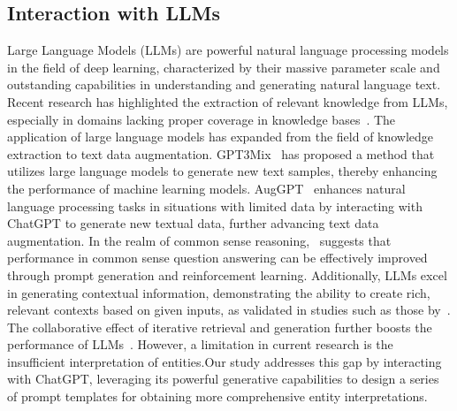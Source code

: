 \subsection{Interaction with LLMs}
Large Language Models (LLMs) are powerful natural language processing models in the field of deep learning, 
characterized by their massive parameter scale and outstanding capabilities in understanding and generating natural language text. 
Recent research has highlighted the extraction of relevant knowledge from LLMs, especially in domains lacking proper coverage in knowledge bases~\citep{fang2021leveraging}. 
The application of large language models has expanded from the field of knowledge extraction to text data augmentation. 
GPT3Mix~\citep{yoo2021gpt3mix} has proposed a method that utilizes large language models to generate new text samples, thereby enhancing the performance of machine learning models.
AugGPT~\citep{dai2023auggpt} enhances natural language processing tasks in situations with limited data by interacting with ChatGPT to generate new textual data, further advancing text data augmentation.
In the realm of common sense reasoning,~\citep{liu2021generated,liu2022rainier} suggests that performance in common sense question answering can be effectively improved through prompt generation and reinforcement learning. 
Additionally, LLMs excel in generating contextual information, demonstrating the ability to create rich, 
relevant contexts based on given inputs, as validated in studies such as those by~\citep{yu2022generate}. 
The collaborative effect of iterative retrieval and generation further boosts the performance of LLMs~\citep{shao2023enhancing}. 
However, a limitation in current research is the insufficient interpretation of entities.Our study addresses this gap by interacting with ChatGPT, 
leveraging its powerful generative capabilities to design a series of prompt templates for obtaining more comprehensive entity interpretations.


